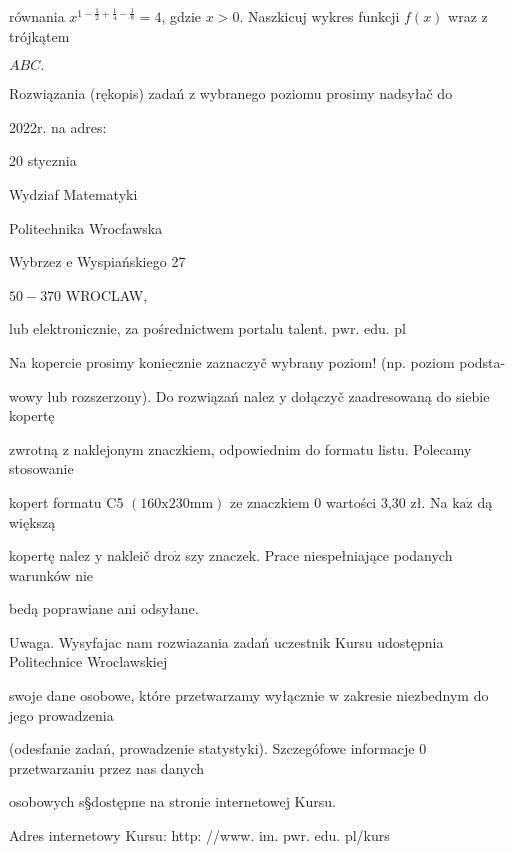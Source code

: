 \documentclass[a4paper,12pt]{article}
\begin{document}
równania $x^{1-\frac{1}{2}+\frac{1}{4}-\frac{1}{8}} =4$, gdzie $x>0$. Naszkicuj wykres funkcji $f(x)$ wraz $\mathrm{z}$ trójkątem

$ABC.$

Rozwiązania (rękopis) zadań z wybranego poziomu prosimy nadsyłač do

2022r. na adres:

20 stycznia

Wydziaf Matematyki

Politechnika Wrocfawska

Wybrzez $\mathrm{e}$ Wyspiańskiego 27

$50-370$ WROCLAW,

lub elektronicznie, za pośrednictwem portalu talent. $\mathrm{p}\mathrm{w}\mathrm{r}$. edu. pl

Na kopercie prosimy $\underline{\mathrm{k}\mathrm{o}\mathrm{n}\mathrm{i}\mathrm{e}\mathrm{c}\mathrm{z}\mathrm{n}\mathrm{i}\mathrm{e}}$ zaznaczyč wybrany poziom! (np. poziom podsta-

wowy lub rozszerzony). Do rozwiązań nalez $\mathrm{y}$ dołączyč zaadresowaną do siebie kopertę

zwrotną $\mathrm{z}$ naklejonym znaczkiem, odpowiednim do formatu listu. Polecamy stosowanie

kopert formatu C5 $(160\mathrm{x}230\mathrm{m}\mathrm{m})$ ze znaczkiem $0$ wartości 3,30 zł. Na $\mathrm{k}\mathrm{a}\dot{\mathrm{z}}$ dą większą

kopertę nalez $\mathrm{y}$ nakleič $\mathrm{d}\mathrm{r}\mathrm{o}\dot{\mathrm{z}}$ szy znaczek. Prace niespełniające podanych warunków nie

bedą poprawiane ani odsyłane.

Uwaga. Wysyfajac nam rozwiazania zadań uczestnik Kursu udostępnia Politechnice Wroclawskiej

swoje dane osobowe, które przetwarzamy wyłącznie $\mathrm{w}$ zakresie niezbednym do jego prowadzenia

(odesfanie zadań, prowadzenie statystyki). Szczegófowe informacje $0$ przetwarzaniu przez nas danych

osobowych s\S dostępne na stronie internetowej Kursu.

Adres internetowy Kursu: http: //www. im. pwr. edu. pl/kurs
\end{document}
